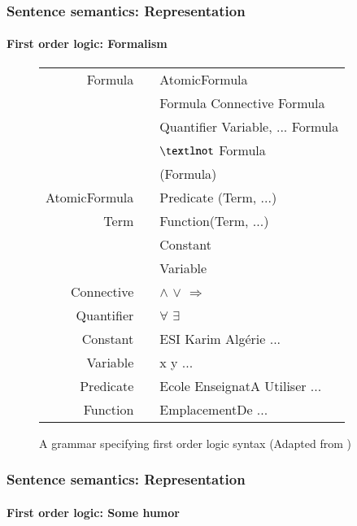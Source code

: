 \documentclass[xcolor=table]{beamer}
\begin{document}
\begin{frame}
	\frametitle{Sentence semantics: Representation}
	\framesubtitle{First order logic: Formalism}
	
	\begin{figure}
		\scriptsize
		\begin{tabular}{rcl}
			\hline\hline
			Formula & \textrightarrow & AtomicFormula \\
			        & \textbar        & Formula Connective Formula \\
			        & \textbar        & Quantifier Variable, ... Formula \\
			        & \textbar        & $\textlnot$ Formula \\
			        & \textbar        & (Formula) \\
			AtomicFormula & \textrightarrow & Predicate (Term, ...) \\
			Term    & \textrightarrow & Function(Term, ...) \\
			        & \textbar        & Constant \\
			        & \textbar        & Variable \\
			Connective & \textrightarrow & $\wedge$ \textbar $\vee$ \textbar $\Rightarrow$ \\
			Quantifier & \textrightarrow & $\forall$ \textbar $\exists$ \\
			Constant & \textrightarrow & ESI \textbar Karim \textbar Algérie ...\\
			Variable & \textrightarrow & x \textbar y \textbar ... \\
			Predicate & \textrightarrow & Ecole \textbar EnseignatA \textbar Utiliser \textbar ... \\
			Function & \textrightarrow & EmplacementDe \textbar ... \\
			\hline\hline
		\end{tabular}
		\caption{A grammar specifying first order logic syntax \cite{2019-jurafsky-martin} (Adapted from \cite{2002-russell-norvig})}
	\end{figure}
	
\end{frame}

\begin{frame}
	\frametitle{Sentence semantics: Representation}
	\framesubtitle{First order logic: Some humor}
	
	\begin{center}
	\end{center}
	
\end{frame}
\end{document}
